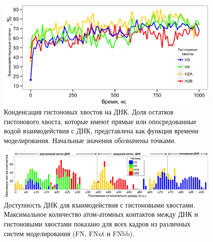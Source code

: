 \begin{figure} [H]
    \centering
    \includegraphics[width=\textwidth]{images/p2/jmb/part2_2_f4.pdf}
    \caption[Конденсация гистоновых хвостов на ДНК]{Конденсация гистоновых хвостов на ДНК. Доля остатков гистонового хвоста, которые имеют прямые или опосредованные водой взаимодействия с ДНК, представлена как функция времени моделирования. Начальные значения обозначены точками.}
    \label{fig:p2_2_f4}
\end{figure}

\begin{figure} [H]
    \centering
    \includegraphics[width=\textwidth]{images/p2/jmb/part2_2_f5.pdf}
    \caption[Доступность ДНК для взаимодействия с гистоновыми хвостами]{Доступность ДНК для взаимодействия с гистоновыми хвостами. Максимальное количество атом-атомных контактов между ДНК и гистоновыми хвостами показано для всех кадров из различных систем моделирования (FN, FNnt и FNbb).}
    \label{fig:p2_2_f5}
\end{figure}



